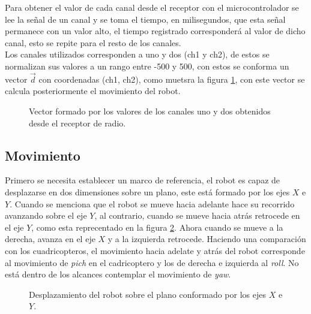 \documentclass{iccmemoria}
\begin{document}
Para obtener el valor de cada canal desde el receptor con el microcontrolador se lee la señal de un canal y se toma el tiempo, en milisegundos, que esta señal permanece con un valor alto, el tiempo registrado corresponderá al valor de dicho canal, esto se repite para el resto de los canales.\\
 
Los canales utilizados corresponden a uno y dos (ch1 y ch2), de estos se normalizan sus valores a un rango entre -500 y 500, con estos se conforma un vector $\vec{d}$ con coordenadas (ch1, ch2), como muetsra la figura \ref{fig:radio_values}, con este vector se calcula posteriormente el movimiento del robot.\\

\begin{figure}[H]
  \centering
  \selectfont{
  
  }
  \caption[Vector formado por las entradas de radio]{Vector formado por los valores de los canales uno y dos obtenidos desde el receptor de radio.}
  \label{fig:radio_values}
\end{figure}

\subsection{Movimiento}

Primero se necesita establecer un marco de referencia, el robot es capaz de desplazarse en dos dimensiones sobre un plano, este está formado por los ejes $X$ e $Y$. Cuando se menciona que el robot se mueve hacia adelante hace su recorrido avanzando sobre el eje $Y$, al contrario, cuando se mueve hacia atrás retrocede en el eje $Y$, como esta reprecentado en la figura \ref{fig:omni_direcition}. Ahora cuando se mueve a la derecha, avanza en el eje $X$ y a la izquierda retrocede. Haciendo una comparación con los cuadricopteros, el movimiento hacia adelate y atrás del robot corresponde al movimiento de \emph{pich} en el cadricoptero y los de derecha e izquierda al \emph{roll}. No está dentro de los alcances contemplar el movimiento de \emph{yaw}.\\

\begin{figure}[H]
  \centering
  \selectfont{
  
  }
  \caption[Desplazamiento del robot sobre el plano $XY$.]{Desplazamiento del robot sobre el plano conformado por los ejes $X$ e $Y$.}
  \label{fig:omni_direcition}
\end{figure}
\end{document}
